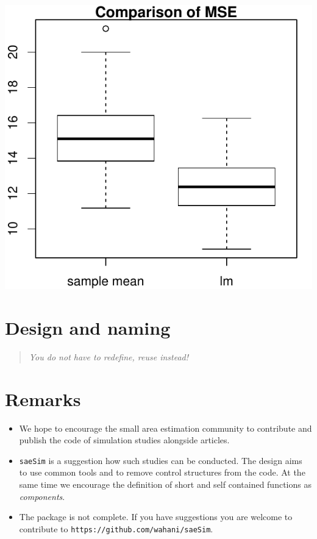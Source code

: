 \documentclass[a0,portrait]{a0poster}\usepackage[]{graphicx}\usepackage[]{color}
\newcommand{\mysec}[1]{\color{Black}\section*{#1}\color{DarkSlateGray}}
\newcommand{\inputR}[1]{}
\begin{document}
\begin{multicols}{2}
\begin{minipage}[b]{0.55\linewidth}
  \inputR{Rmd/extensions}
\end{minipage}
\hfill
\begin{minipage}[b]{0.45\linewidth}
\includegraphics[width=\linewidth]{extensions/extensions_boxplot-1}
\end{minipage}

\mysec{Design and naming}

\begin{verse}
\textit{You do not have to redefine, reuse instead!}
\end{verse}
\inputR{Rmd/basicIdea}


\mysec{Remarks}

\begin{itemize}
  \item We hope to encourage the small area estimation community to contribute and publish the code of simulation studies alongside articles.
  \item \texttt{saeSim} is a suggestion how such studies can be conducted. The design aims to use common tools and to remove control structures from the code. At the same time we encourage the definition of short and self contained functions as \textit{components}.
  \item The package is not complete. If you have suggestions you are welcome to contribute to \texttt{https://github.com/wahani/saeSim}.
\end{itemize}


\end{multicols}
\end{document}

